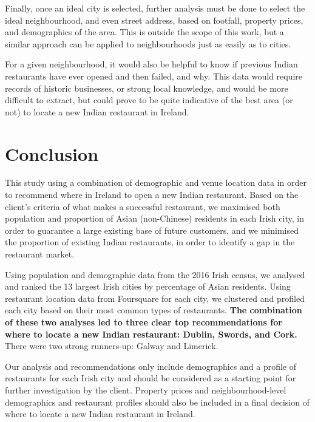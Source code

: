 \documentclass[a4paper,11pt]{article}
\begin{document}
Finally, once an ideal city is selected, further analysis must be done to select the ideal neighbourhood, and even street address, based on footfall, property prices, and demographics of the area. This is outside the scope of this work, but a similar approach can be applied to neighbourhoods just as easily as to cities.

For a given neighbourhood, it would also be helpful to know if previous Indian restaurants have ever opened and then failed, and why. This data would require records of historic businesses, or strong local knowledge, and would be more difficult to extract, but could prove to be quite indicative of the best area (or not) to locate a new Indian restaurant in Ireland.

\section{Conclusion}

This study using a combination of demographic and venue location data in order to recommend where in Ireland to open a new Indian restaurant. Based on the client's criteria of what makes a successful restaurant, we maximised both population and proportion of Asian (non-Chinese) residents in each Irish city, in order to guarantee a large existing base of future customers, and we minimised the proportion of existing Indian restaurants, in order to identify a gap in the restaurant market.

Using population and demographic data from the 2016 Irish census, we analysed and ranked the 13 largest Irish cities by percentage of Asian residents. Using restaurant location data from Foursquare for each city, we clustered and profiled each city based on their most common types of restaurants. \textbf{The combination of these two analyses led to three clear top recommendations for where to locate a new Indian restaurant: Dublin, Swords, and Cork.} There were two strong runners-up: Galway and Limerick.

Our analysis and recommendations only include demographics and a profile of restaurants for each Irish city and should be considered as a starting point for further investigation by the client. Property prices and neighbourhood-level demographics and restaurant profiles should also be included in a final decision of where to locate a new Indian restaurant in Ireland.
\end{document}

